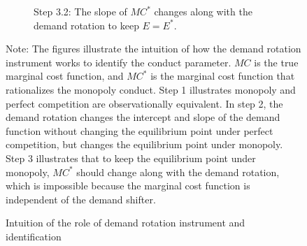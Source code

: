 \documentclass[11pt, a4paper]{article}
\theoremstyle{remark}
\begin{document}
\begin{figure}[p!]
\begin{center}
\begin{subfigure}[b]{0.45\textwidth}
            \caption{Step 3.2: The slope of $MC^{*}$ changes along with the demand rotation to keep $E = E^{*}$.}
            \label{fig:identification_example_step_3_2}
        \end{subfigure}
    \end{center}
    \caption{Intuition of the role of demand rotation instrument and identification}
    \label{fig:identification_example}
    \vspace{2mm}
    \footnotesize
    Note: The figures illustrate the intuition of how the demand rotation instrument works to identify the conduct parameter.
    $MC$ is the true marginal cost function, and $MC^{*}$ is the marginal cost function that rationalizes the monopoly conduct.
    Step 1 illustrates monopoly and perfect competition are observationally equivalent.
    In step 2, the demand rotation changes the intercept and slope of the demand function without changing the equilibrium point under perfect competition, but changes the equilibrium point under monopoly.
    Step 3 illustrates that to keep the equilibrium point under monopoly, $MC^{*}$ should change along with the demand rotation, which is impossible because the marginal cost function is independent of the demand shifter.
\end{figure}
\end{document}
